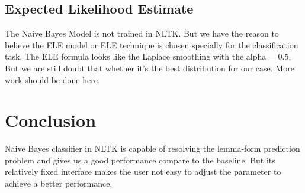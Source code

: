 \documentclass[a4paper]{article}
\begin{document}
\subsection*{Expected Likelihood Estimate}
The Naive Bayes Model is not trained in NLTK. But we have the reason to believe the ELE model or ELE technique is chosen specially for the classification task. 
The ELE formula looks like the Laplace smoothing with the alpha = 0.5.
But we are still doubt that whether it's the best distribution for our case. More work should be done here.

\section{Conclusion}
Naive Bayes classifier in NLTK is capable of resolving the lemma-form prediction problem and gives us a good performance compare to the baseline. But its relatively fixed interface makes the user not easy to adjust the parameter to achieve a better performance.





\end{document}
